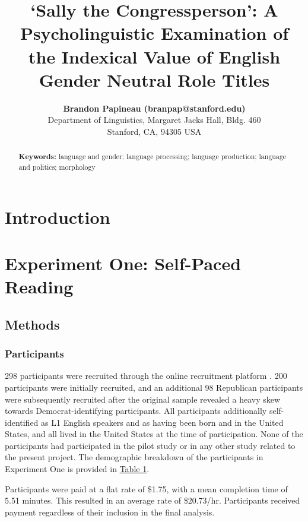 \documentclass[10pt,letterpaper]{article}
\title{`Sally the Congressperson': A Psycholinguistic Examination of the Indexical Value of English Gender Neutral Role Titles}
\author{{\large \bf Brandon Papineau (branpap@stanford.edu)} \\
	Department of Linguistics, Margaret Jacks Hall, Bldg. 460\\
	Stanford, CA, 94305 USA}
\begin{document}
	
	\maketitle
	
	\begin{abstract} 
		
		\textbf{Keywords:} 
		language and gender; language processing; language production; language and politics; morphology
	\end{abstract}
	
	
	\section{Introduction}
	
	\section{Experiment One: Self-Paced Reading}
	\subsection{Methods}
	\subsubsection{Participants}
	298 participants were recruited through the online recruitment platform \textcite{prolific}. 200 participants were initially recruited, and an additional 98 Republican participants were subsequently recruited after the original sample revealed a heavy skew towards Democrat-identifying participants. All participants additionally self-identified as L1 English speakers and as having been born and in the United States, and all lived in the United States at the time of participation. None of the participants had participated in the pilot study or in any other study related to the present project. The demographic breakdown of the participants in Experiment One is provided in \hyperref[exp1-sample-table]{Table 1}.\par 
	Participants were paid at a flat rate of \$1.75, with a mean completion time of 5.51 minutes. This resulted in an average rate of \$20.73/hr. Participants received payment regardless of their inclusion in the final analysis.
	
\end{document}
